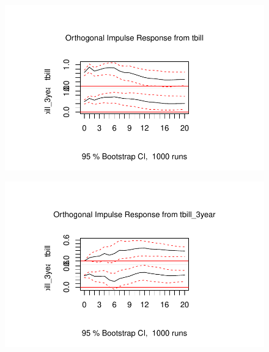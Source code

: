 \documentclass[
  letterpaper,
  DIV=11,
  numbers=noendperiod]{scrartcl}
\begin{document}
\begin{figure}[H]

{\centering \includegraphics{Homework4_files/figure-pdf/unnamed-chunk-9-1.pdf}

}

\end{figure}

\begin{figure}[H]

{\centering \includegraphics{Homework4_files/figure-pdf/unnamed-chunk-9-2.pdf}

}

\end{figure}
\end{document}
